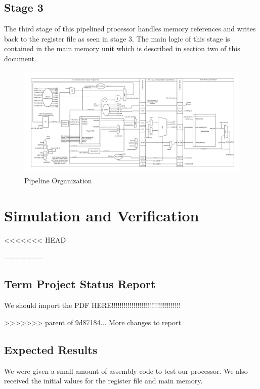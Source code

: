 	
    \subsection{Stage 3}
    The third stage of this pipelined processor handles memory references and writes back to the
    register file as seen in stage 3. The main logic of this stage is contained in the 
    main memory unit which is described in section two of this document.
    \FloatBarrier
    \newpage  
    \begin{figure}[htpb]
        \centering
        \includegraphics[angle=90,width=.68\textwidth]{./figures/142.pdf}
        \caption{Pipeline Organization}
        \label{fullschematic}
    \end{figure}
    \FloatBarrier


    \onecolumn

	\section{Simulation and Verification}
<<<<<<< HEAD

=======
	\subsection{Term Project Status Report}
	We should import the PDF HERE!!!!!!!!!!!!!!!!!!!!!!!!!!!!!!!!!!!
	
>>>>>>> parent of 9d87184... More changes to report
	\subsection{Expected Results}
	We were given a small amount of assembly code to test our processor. We also
	received the initial values for the register file and main memory. 
	
	
